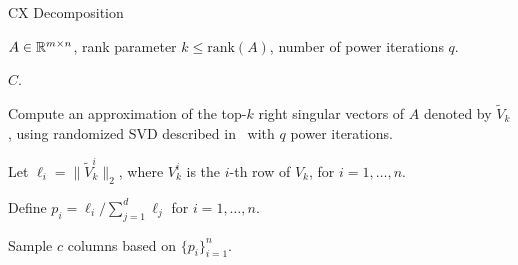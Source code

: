 
 \begin{algorithm}[tb]
 \caption{CX Decomposition}
  \label{alg:cx}
  \begin{algorithmic}[1]
    \Require $A \in \mathbb{R}^{m\times n}$, rank parameter $k \leq \textrm{rank}(A)$, number of power iterations $q$.

    \Ensure $C$.
    

    \State Compute an approximation of the top-$k$ right singular vectors of $A$ denoted by $\tilde V_k$, using randomized SVD described in~\cite{HMT09_SIREV} with $q$ power iterations.
    
    \State Let $\ell_i = \| \tilde V_k^i\|_2$, where $V_k^i$ is the $i$-th row of $V_k$, for $i = 1, \ldots, n$. 
    
    \State Define $p_i = \ell_i / \sum_{j=1}^d \ell_j$ for $i=1,\ldots,n$.
    
    \State Sample $c$ columns based on $\{p_i\}_{i=1}^n$.

    

    \end{algorithmic}
\end{algorithm}



